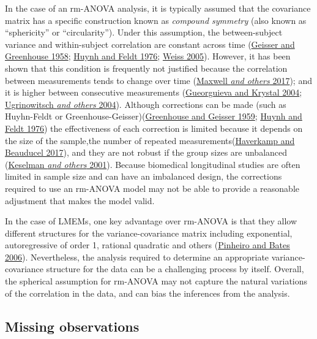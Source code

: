 \documentclass[
]{article}
\begin{document}
In the case of an rm-ANOVA analysis, it is typically assumed that the covariance matrix has a specific construction known as \emph{compound symmetry} (also known as ``sphericity'' or ``circularity''). Under this assumption, the between-subject variance and within-subject correlation are constant across time (\protect\hyperlink{ref-geisser1958}{Geisser and Greenhouse 1958}; \protect\hyperlink{ref-huynh1976}{Huynh and Feldt 1976}; \protect\hyperlink{ref-weiss2005}{Weiss 2005}). However, it has been shown that this condition is frequently not justified because the correlation between measurements tends to change over time (\protect\hyperlink{ref-maxwell2017}{Maxwell \emph{and others} 2017}); and it is higher between consecutive measurements (\protect\hyperlink{ref-gueorguieva2004}{Gueorguieva and Krystal 2004}; \protect\hyperlink{ref-ugrinowitsch2004}{Ugrinowitsch \emph{and others} 2004}). Although corrections can be made (such as Huyhn-Feldt or Greenhouse-Geisser)(\protect\hyperlink{ref-greenhouse1959}{Greenhouse and Geisser 1959}; \protect\hyperlink{ref-huynh1976}{Huynh and Feldt 1976}) the effectiveness of each correction is limited because it depends on the size of the sample,the number of repeated measurements(\protect\hyperlink{ref-haverkamp2017}{Haverkamp and Beauducel 2017}), and they are not robust if the group sizes are unbalanced (\protect\hyperlink{ref-keselman2001}{Keselman \emph{and others} 2001}). Because biomedical longitudinal studies are often limited in sample size and can have an imbalanced design, the corrections required to use an rm-ANOVA model may not be able to provide a reasonable adjustment that makes the model valid.

In the case of LMEMs, one key advantage over rm-ANOVA is that they allow different structures for the variance-covariance matrix including exponential, autoregressive of order 1, rational quadratic and others (\protect\hyperlink{ref-pinheiro2006}{Pinheiro and Bates 2006}). Nevertheless, the analysis required to determine an appropriate variance-covariance structure for the data can be a challenging process by itself. Overall, the spherical assumption for rm-ANOVA may not capture the natural variations of the correlation in the data, and can bias the inferences from the analysis.

\hypertarget{missing-observations}{%
\subsection{Missing observations}\label{missing-observations}}
\end{document}
